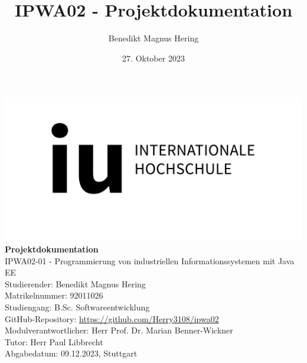 \documentclass[11pt]{article}
\author{Benedikt Magnus Hering}
\title{IPWA02 - Projektdokumentation}
\date{27. Oktober 2023}
\begin{document}
    \begin{titlepage}
        \begin{center}
            \includegraphics[max width=\textwidth]{iu_logo.png}
            \textbf{Projektdokumentation}
            \\[1\baselineskip]
            IPWA02-01 - Programmierung von industriellen Informationssystemen mit Java EE
            \\[1\baselineskip]
            Studierender: Benedikt Magnus Hering
            \\
            Matrikelnummer: 92011026 
            \\
            Studiengang: B.Sc. Softwareentwicklung
            \\
            GitHub-Repository: \href{https://github.com/Herry3108/ipwa02}{https://github.com/Herry3108/ipwa02}
            \\[1\baselineskip]
            Modulverantwortlicher: Herr Prof. Dr. Marian Benner-Wickner
            \\
            Tutor: Herr Paul Libbrecht
            \\[2\baselineskip]
            Abgabedatum: 09.12.2023, Stuttgart
        \end{center}    
    \end{titlepage}


    \tableofcontents

    \newpage
    \listoffigures

    \newpage
    \printnoidxglossaries

    \newpage
\end{document}
